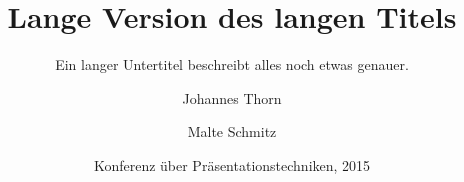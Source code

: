 \documentclass{beamer}
\title[Kurztitel]{%
  Lange Version des langen Titels}
\subtitle{Ein langer Untertitel beschreibt
  alles noch etwas genauer.}
\author[Thorn, Schmitz]{%
  Johannes Thorn \and Malte Schmitz}
\date[KPT 2015]{Konferenz über
  Präsentationstechniken, 2015}
\begin{document}
  \begin{frame}
    \maketitle
  \end{frame}
\end{document}
